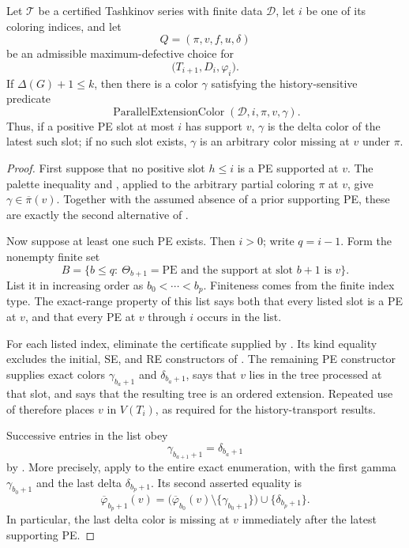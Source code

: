 \begin{lemma}
Let \(\mathcal T\) be a certified Tashkinov series with finite data
\(\mathcal D\), let \(i\) be one of its coloring indices, and let
\[
 Q=(\pi,v,f,u,\delta)
\]
be an admissible maximum-defective choice for
\[
 \bigl(T_{i+1},D_i,\varphi_i\bigr).
\]
If \(\Delta(G)+1\leq k\), then there is a color \(\gamma\) satisfying
the history-sensitive predicate
\[
                 \operatorname{ParallelExtensionColor}
                    (\mathcal D,i,\pi,v,\gamma).
\]
Thus, if a positive PE slot at most \(i\) has support \(v\), \(\gamma\)
is the delta color of the latest such slot; if no such slot exists,
\(\gamma\) is an arbitrary color missing at \(v\) under \(\pi\).
\end{lemma}
\begin{proof}
First suppose that no positive slot \(h\leq i\) is a PE supported at
\(v\).  The palette inequality and
, applied to the arbitrary
partial coloring \(\pi\) at \(v\), give
\(\gamma\in\overline\pi(v)\).  Together with the assumed absence of a
prior supporting PE, these are exactly the second alternative of
.

Now suppose at least one such PE exists.  Then \(i>0\); write \(q=i-1\).
Form the nonempty finite set
\[
 B=\{b\leq q:\ \Theta_{b+1}=\mathrm{PE}
                 \text{ and the support at slot }b+1\text{ is }v\}.
\]
List it in increasing order as
\(b_0<\cdots<b_p\).  Finiteness comes from the finite index type.
The exact-range property of this list says both that every listed slot
is a PE at \(v\), and that every PE at \(v\) through \(i\) occurs in the
list.

For each listed index, eliminate the certificate supplied by
.  Its kind equality excludes the initial, SE,
and RE constructors of .  The remaining PE
constructor supplies exact colors \(\gamma_{b_a+1}\) and
\(\delta_{b_a+1}\), says that \(v\) lies in the tree processed at that
slot, and says that the resulting tree is an ordered extension.  Repeated
use of  therefore places \(v\) in
\(V(T_i)\), as required for the history-transport results.

Successive entries in the list obey
\[
             \gamma_{b_{a+1}+1}=\delta_{b_a+1}
\]
by .  More precisely, apply
 to the entire exact enumeration,
with the first gamma \(\gamma_{b_0+1}\) and the last delta
\(\delta_{b_p+1}\).  Its second asserted equality is
\[
 \overline{\varphi}_{b_p+1}(v)
  =\bigl(\overline{\varphi}_{b_0}(v)
        \setminus\{\gamma_{b_0+1}\}\bigr)
       \cup\{\delta_{b_p+1}\}.                                 \tag{1}
\]
In particular, the last delta color is missing at \(v\) immediately
after the latest supporting PE.


\end{proof}
